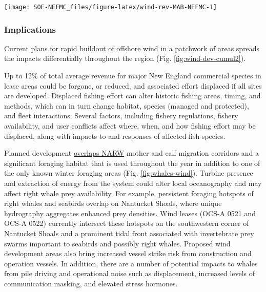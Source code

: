 \documentclass[
  10pt,
]{article}
\let\origfigure\figure
\let\endorigfigure\endfigure
\renewenvironment{figure}[1][2] {
    \expandafter\origfigure\expandafter[H]
} {
    \endorigfigure
}
\begin{document}
\begin{figure}

\texttt{[image: SOE-NEFMC\_files/figure-latex/wind-rev-MAB-NEFMC-1]} \hfill{}

\caption{Percent of Mid-Atlantic port revenue with majority NEFMC landings from Wind Energy Areas (WEA) in descending order from most to least port fisheries revenue from WEA. EJ = Environmental Justice.}\label{fig:wind-rev-MAB-NEFMC}
\end{figure}

\hypertarget{implications-6}{%
\subsubsection{Implications}\label{implications-6}}

Current plans for rapid buildout of offshore wind in a patchwork of areas spreads the impacts differentially throughout the region (Fig. \ref{fig:wind-dev-cumul2}).

Up to 12\% of total average revenue for major New England commercial species in lease areas could be forgone, or reduced, and associated effort displaced if all sites are developed. Displaced fishing effort can alter historic fishing areas, timing, and methods, which can in turn change habitat, species (managed and protected), and fleet interactions. Several factors, including fishery regulations, fishery availability, and user conflicts affect where, when, and how fishing effort may be displaced, along with impacts to and responses of affected fish species.

Planned development \href{https://noaa-edab.github.io/catalog/right-whale-abundance.html}{overlaps NARW} mother and calf migration corridors and a significant foraging habitat that is used throughout the year in addition to one of the only known winter foraging areas (Fig. \ref{fig:whales-wind}). Turbine presence and extraction of energy from the system could alter local oceanography and may affect right whale prey availability. For example, persistent foraging hotspots of right whales and seabirds overlap on Nantucket Shoals, where unique hydrography aggregates enhanced prey densities. Wind leases (OCS-A 0521 and OCS-A 0522) currently intersect these hotspots on the southwestern corner of Nantucket Shoals and a prominent tidal front associated with invertebrate prey swarms important to seabirds and possibly right whales. Proposed wind development areas also bring increased vessel strike risk from construction and operation vessels. In addition, there are a number of potential impacts to whales from pile driving and operational noise such as displacement, increased levels of communication masking, and elevated stress hormones.
\end{document}
